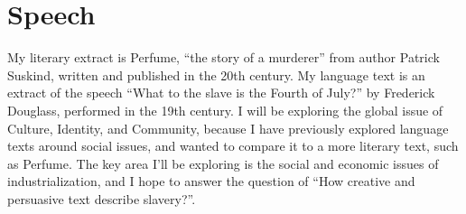\documentclass[a4paper,12pt]{article}
\begin{document}
\section{Speech}
My literary extract is Perfume, ``the story of a murderer'' from author Patrick Suskind, written and published in the 20th century. My language text is an extract of the speech ``What to the slave is the Fourth of July?'' by Frederick Douglass, performed in the 19th century. I will be exploring the global issue of Culture, Identity, and Community, because I have previously explored language texts around social issues, and wanted to compare it to a more literary text, such as Perfume. The key area I'll be exploring is the social and economic issues of industrialization, and I hope to answer the question of ``How creative and persuasive text describe slavery?''.
\end{document}
